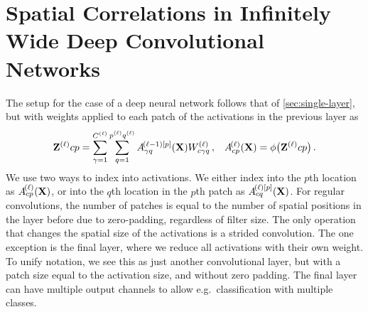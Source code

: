 \documentclass[tablecaption=bottom,wcp,nonatbib]{jmlr} %
\begin{document}

\section{Spatial Correlations in Infinitely Wide Deep Convolutional Networks\label{sec:correlated-weights}}
The setup for the case of a deep neural network follows that of \cref{sec:single-layer}, but with weights applied to each patch of the activations in the previous layer as
\begin{align}
    \mathbf{Z}^{(\ell)}{cp} = \sum_{\gamma=1}^{C^{(\ell)}}\sum_{q=1}^{p^{(\ell)}q^{(\ell)}} A^{\!(\ell-1)[p]}_{\gamma q}(\mathbf{X}) W^{(\ell)}_{c\gamma q} \,, && A^{\!(\ell)}_{cp}(\mathbf{X}) = \phi\big(\mathbf{Z}^{(\ell)}{cp}\big) \,. \label{eq:deep-recursion}
\end{align}
We use two ways to index into activations. We either index into the $p$th location as $A^{\!(\ell)}_{cp}(\mathbf{X})$, or into the $q$th location in the $p$th patch as $A^{\!(\ell)[p]}_{cq}(\mathbf{X})$. For regular convolutions, the number of patches is equal to the number of spatial positions in the layer before due to zero-padding, regardless of filter size. The only operation that changes the spatial size of the activations is a strided convolution. The one exception is the final layer, where we reduce all activations with their own weight. To unify notation, we see this as just another convolutional layer, but with a patch size equal to the activation size, and without zero padding. The final layer can have multiple output channels to allow e.g.~classification with multiple classes.
\end{document}
